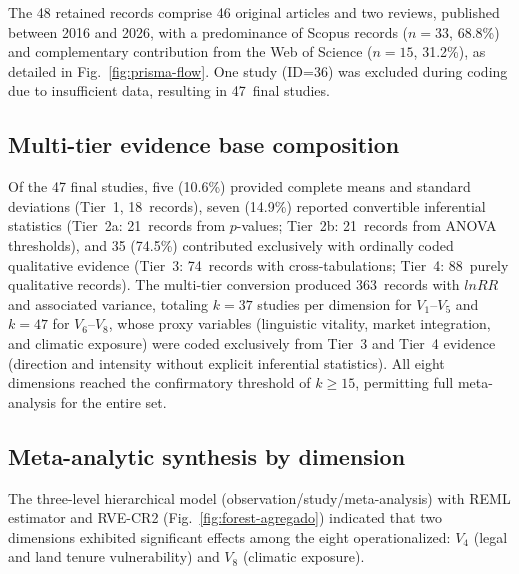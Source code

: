 \documentclass[12pt,a4paper]{article}
\begin{document}
The 48 retained records comprise 46 original articles and two reviews, published between 2016 and 2026, with a predominance of Scopus records ($n = 33$, 68.8\%) and complementary contribution from the Web of Science ($n = 15$, 31.2\%), as detailed in Fig.~\ref{fig:prisma-flow}. One study (ID=36) was excluded during coding due to insufficient data, resulting in 47~final studies.

\subsection{Multi-tier evidence base composition}
\label{sec:tier-composition}

Of the 47 final studies, five (10.6\%) provided complete means and standard deviations (Tier~1, 18~records), seven (14.9\%) reported convertible inferential statistics (Tier~2a: 21~records from $p$-values; Tier~2b: 21~records from ANOVA thresholds), and 35 (74.5\%) contributed exclusively with ordinally coded qualitative evidence (Tier~3: 74~records with cross-tabulations; Tier~4: 88~purely qualitative records). The multi-tier conversion produced 363~records with $lnRR$ and associated variance, totaling $k = 37$ studies per dimension for $V_1$--$V_5$ and $k = 47$ for $V_6$--$V_8$, whose proxy variables (linguistic vitality, market integration, and climatic exposure) were coded exclusively from Tier~3 and Tier~4 evidence (direction and intensity without explicit inferential statistics). All eight dimensions reached the confirmatory threshold of $k \geq 15$, permitting full meta-analysis for the entire set.

\subsection{Meta-analytic synthesis by dimension}
\label{sec:meta-results}

The three-level hierarchical model (observation/study/meta-analysis) with REML estimator and RVE-CR2 (Fig.~\ref{fig:forest-agregado}) indicated that two dimensions exhibited significant effects among the eight operationalized: $V_4$ (legal and land tenure vulnerability) and $V_8$ (climatic exposure).
\end{document}
